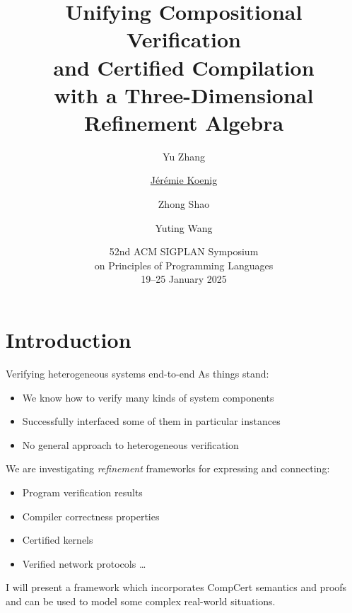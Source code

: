 \documentclass[aspectratio=1610,mathserif]{beamer}
\title[Unifying \ldots with 3D Refinement]{%
  Unifying Compositional Verification \\
  and Certified Compilation \\
  with a Three-Dimensional Refinement Algebra
}
\author[Zhang \and Koenig \and Shao \and Wang]{%
  Yu Zhang\inst1 \and
  \underline{J\'er\'emie Koenig}\inst1 \and
  Zhong Shao\inst1 \and
  Yuting Wang\inst2
}
\institute[Yale, SJTU]{%
  \inst1 Yale University \and
  \inst2 Shanghai Jiao Tong University
}
\date[POPL 2025]{%
  52nd ACM SIGPLAN Symposium \\
  on Principles of Programming Languages \\
  19--25 January 2025
}
\begin{document}
\maketitle

\section{Introduction}

\begin{frame}{Verifying heterogeneous systems end-to-end} %
\pause
As things stand:
\begin{itemize}
  \item We know how to verify many kinds of system components
  \pause
  \item Successfully interfaced some of them in particular instances
  \pause
  \item No general approach to heterogeneous verification
\end{itemize}

\vfill \pause
We are investigating \emph{refinement} frameworks
for expressing and connecting:
\begin{itemize}
  \pause
  \item Program verification results
  \pause
  \item Compiler correctness properties
  \pause
  \item Certified kernels
  \pause
  \item Verified network protocols \ldots
\end{itemize}

\vfill \pause
I will present a framework which
incorporates CompCert semantics and proofs \\
and can be used to model some complex real-world situations.
\end{frame}

\end{document}
